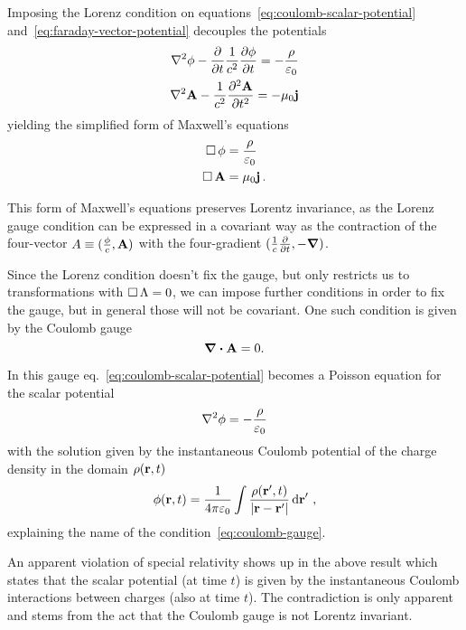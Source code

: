 \documentclass[class=report, crop=false]{standalone}
\begin{document}
Imposing the Lorenz condition on equations~\eqref{eq:coulomb-scalar-potential}
and~\eqref{eq:faraday-vector-potential} decouples the potentials
\begin{align*}
  \laplacian{\phi} - \pdv{t} \frac{1}{c^2} \pdv{\phi}{t} = -\frac{\rho}{\varepsilon_0} \\
  \laplacian{\vb{A}} - \frac{1}{c^2}\pdv[2]{\vb{A}}{t} = -\mu_0 \vb{j}
\end{align*}
yielding the simplified form of Maxwell's equations
\begin{align*}
  \operatorname{\Box} \phi &= \frac{\rho}{\varepsilon_0} \\
  \operatorname{\Box} \vb{A} &= \mu_0 \vb{j}\,.
\end{align*}

This form of Maxwell's equations preserves Lorentz invariance, as the Lorenz
gauge condition can be expressed in a covariant way as the contraction of the
four-vector \(A \equiv (\frac{\phi}{c}, \vb{A})\) with the four-gradient
\((\frac{1}{c}\pdv{t}, -\grad)\).

Since the Lorenz condition doesn't fix the gauge, but only restricts us to
transformations with \(\operatorname{\Box} \Lambda = 0\), we can impose further conditions
in order to fix the gauge, but in general those will not be covariant.
One such condition is given by the Coulomb gauge
\begin{equation}
  \label{eq:coulomb-gauge}
  \div{\vb{A}} = 0.
\end{equation}

In this gauge eq.~\eqref{eq:coulomb-scalar-potential} becomes a Poisson equation
for the scalar potential
\begin{equation}
  \label{eq:coulomb-poisson}
  \laplacian{\phi} = -\frac{\rho}{\varepsilon_0}
\end{equation}
with the solution given by the instantaneous Coulomb potential of the charge
density in the domain \(\rho(\vb{r},t)\)
\begin{equation}
  \label{eq:scalar-potential-solution}
  \phi(\vb{r},t) = \frac{1}{4\pi \varepsilon_0} \int \frac{\rho(\vb{r}',t)}{|\vb{r}-\vb{r}'|} \dd{\vb{r}}'\,,
\end{equation}
explaining the name of the condition~\eqref{eq:coulomb-gauge}.

An apparent violation of special relativity shows up in the above result which
states that the scalar potential (at time \(t\)) is given by the instantaneous Coulomb
interactions between charges (also at time \(t\)). The contradiction is only
apparent and stems from the act that the Coulomb gauge is not Lorentz invariant.
\end{document}
